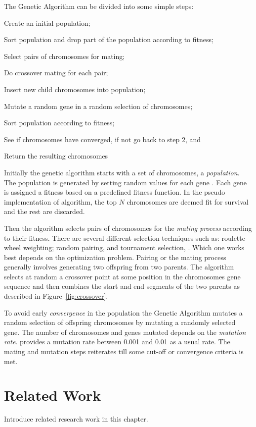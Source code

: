 The Genetic Algorithm can be divided into some simple steps:
\begin{inparaenum}[\itshape 1\upshape)]
\item Create an initial population;
\item Sort population and drop part of the population according to fitness;
\item Select pairs of chromosomes for mating;
\item Do crossover mating for each pair;
\item Insert new child chromosomes into population;
\item Mutate a random gene in a random selection of chromosomes;
\item Sort population according to fitness;
\item See if chromosomes have converged, if not go back to step 2, and
\item Return the resulting chromosomes
\end{inparaenum}

Initially the genetic algorithm starts with a set of chromosomes, a \textit{population}. The population is generated by setting random values for each gene \cite{Haupt2004a,Negnevitsky2002,Goldberg1989}. Each gene is assigned a fitness based on a predefined fitness function. In the pseudo implementation of \citeauthor{Haupt2004a} algorithm, the top \(N\) chromosomes are deemed fit for survival and the rest are discarded.

Then the algorithm selects pairs of chromosomes for the \textit{mating process} according to their fitness. There are several different selection techniques such as: roulette-wheel weighting; random pairing, and tournament selection, \cite{Haupt2004a}. Which one works best depends on the optimization problem. Pairing or the mating process generally involves generating two offspring from two parents. The algorithm selects at random a crossover point at some position in the chromosomes gene sequence and then combines the start and end segments of the two parents as described in Figure~\ref{fig:crossover}.

To avoid early \textit{convergence} in the population the Genetic Algorithm mutates a random selection of offspring chromosomes by mutating a randomly selected gene. The number of chromosomes and genes mutated depends on the \textit{mutation rate}. \cite{Goldberg1989,Negnevitsky2002} provides a mutation rate between 0.001 and 0.01 as a usual rate. The mating and mutation steps reiterates till some cut-off or convergence criteria is met.

\section{Related Work}
\label{RelatedWork}
Introduce related research work in this chapter.